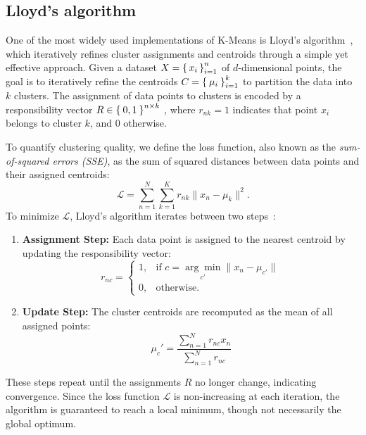 \documentclass[10pt,twocolumn,letterpaper]{article}
\begin{document}

\subsection{Lloyd's algorithm}\label{subsec:procedure-and-lloyd's-algorithm}

One of the most widely used implementations of K-Means is Lloyd’s
algorithm~\cite{deuschle2019}, which iteratively refines cluster assignments
and centroids through a simple yet effective approach. Given a dataset
$X=\set{x_i}_{i=1}^n$ of $d$-dimensional points, the goal is to iteratively
refine the centroids $C=\Set{\mu_i}_{i=1}^k$ to partition the data into $k$
clusters. The assignment of data points to clusters is encoded by a
responsibility vector $R\in\Set{0,1}^{n\times k}$ , where $r_{nk}=1$ indicates
that point $x_i$ belongs to cluster $k$, and $0$ otherwise.

To quantify clustering quality, we define the loss function, also known as the
\textit{sum-of-squared errors (SSE)}, as the sum of squared distances between
data points and their assigned centroids:
\begin{equation}
    \label{eq:lloyds-loss}
    \mathcal{L} = \sum_{n=1}^{N} \sum_{k=1}^{K} r_{nk} \|x_n - \mu_k\|^2.
\end{equation}
To minimize $\mathcal{L}$, Lloyd's algorithm iterates between two steps~\cite{deuschle2019, FRANTI201995}:
\begin{enumerate}
    \item \textbf{Assignment Step:} Each data point is assigned to the nearest centroid by updating the responsibility vector:
          \begin{equation}
              \label{eq:lloyds-res-vec}
              r_{nc} =
              \begin{cases}
                  1, & \text{if } c = \underset{c'}{\arg\min} \|x_n - \mu_{c'}\| \\
                  0, & \text{otherwise.}
              \end{cases}
          \end{equation}
    \item \textbf{Update Step:} The cluster centroids are recomputed as the mean of all assigned points:
          \begin{equation}
              \label{eq:min-lloyds-loss}
              \mu_c' = \frac{\sum_{n=1}^{N} r_{nc} x_n}{\sum_{n=1}^{N} r_{nc}}
          \end{equation}
\end{enumerate}
These steps repeat until the assignments $R$ no longer change, indicating
convergence. Since the loss function $\mathcal{L}$ is non-increasing at each
iteration, the algorithm is guaranteed to reach a local minimum, though not
necessarily the global optimum.
\end{document}
